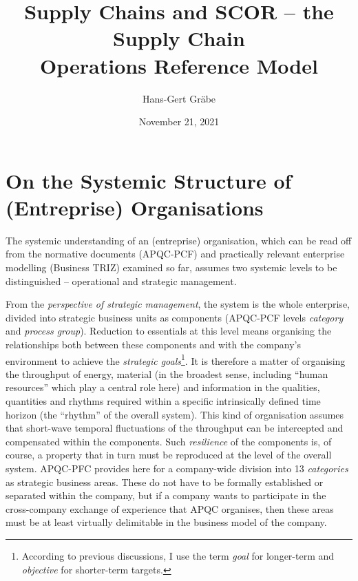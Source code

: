 \documentclass[11pt,a4paper]{article}
\title{Supply Chains and SCOR -- the Supply Chain\\ Operations Reference
  Model}
\author{Hans-Gert Gr\"abe}
\date{November 21, 2021}
\begin{document}
\maketitle

\section{On the Systemic Structure of (Entreprise) Organisations}

The systemic understanding of an (entreprise) organisation, which can be read
off from the normative documents (APQC-PCF) and practically relevant
enterprise modelling (Business TRIZ) examined so far, assumes two systemic
levels to be distinguished -- operational and strategic management.

From the \emph{perspective of strategic management}, the system is the whole
enterprise, divided into strategic business units as components (APQC-PCF
levels \emph{category} and \emph{process group}). Reduction to essentials at
this level means organising the relationships both between these components
and with the company's environment to achieve the \emph{strategic
  goals}\footnote{According to previous discussions, I use the term
  \emph{goal} for longer-term and \emph{objective} for shorter-term targets.}.
It is therefore a matter of organising the throughput of energy, material (in
the broadest sense, including \enquote{human resources} which play a central
role here) and information in the qualities, quantities and rhythms required
within a specific intrinsically defined time horizon (the \enquote{rhythm} of
the overall system). This kind of organisation assumes that short-wave
temporal fluctuations of the throughput can be intercepted and compensated
within the components. Such \emph{resilience} of the components is, of course,
a property that in turn must be reproduced at the level of the overall
system. APQC-PFC provides here for a company-wide division into 13
\emph{categories} as strategic business areas. These do not have to be
formally established or separated within the company, but if a company wants
to participate in the cross-company exchange of experience that APQC
organises, then these areas must be at least virtually delimitable in the
business model of the company.
\end{document}
